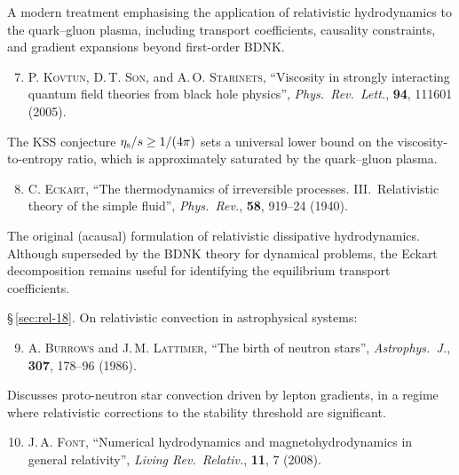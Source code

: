 \noindent A modern treatment emphasising the application of
relativistic hydrodynamics to the quark--gluon plasma, including
transport coefficients, causality constraints, and gradient expansions
beyond first-order BDNK.

\begin{enumerate}
\setcounter{enumi}{6}

\item \textsc{P. Kovtun}, \textsc{D.\,T. Son}, and
  \textsc{A.\,O. Starinets}, ``Viscosity in strongly interacting
  quantum field theories from black hole physics'',
  \textit{Phys.\ Rev.\ Lett.}, \textbf{94}, 111601 (2005).

\end{enumerate}

\noindent The KSS conjecture $\eta_{\mathrm{s}}/s \geq 1/(4\pi)$ sets a
universal lower bound on the viscosity-to-entropy ratio, which is
approximately saturated by the quark--gluon plasma.

\begin{enumerate}
\setcounter{enumi}{7}

\item \textsc{C. Eckart}, ``The thermodynamics of irreversible
  processes. III.\ Relativistic theory of the simple fluid'',
  \textit{Phys.\ Rev.}, \textbf{58}, 919--24 (1940).

\end{enumerate}

\noindent The original (acausal) formulation of relativistic dissipative
hydrodynamics.  Although superseded by the BDNK theory for
dynamical problems, the Eckart decomposition remains useful for
identifying the equilibrium transport coefficients.

\noindent\S\,\ref{sec:rel-18}. On relativistic convection in
astrophysical systems:

\begin{enumerate}
\setcounter{enumi}{8}

\item \textsc{A. Burrows} and \textsc{J.\,M. Lattimer}, ``The birth
  of neutron stars'', \textit{Astrophys.\ J.}, \textbf{307}, 178--96
  (1986).

\end{enumerate}

\noindent Discusses proto-neutron star convection driven by lepton
gradients, in a regime where relativistic corrections to the stability
threshold are significant.

\begin{enumerate}
\setcounter{enumi}{9}

\item \textsc{J.\,A. Font}, ``Numerical hydrodynamics and
  magnetohydrodynamics in general relativity'',
  \textit{Living Rev.\ Relativ.}, \textbf{11}, 7 (2008).

\end{enumerate}


